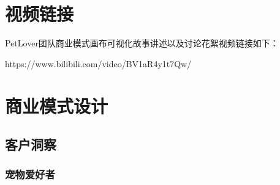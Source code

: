 \documentclass[a4paper]{ctexart}
\begin{document}
\section{视频链接}

PetLover团队商业模式画布可视化故事讲述以及讨论花絮视频链接如下：

https://www.bilibili.com/video/BV1aR4y1t7Qw/

\section{商业模式设计}

\subsection{客户洞察}

\subsubsection{宠物爱好者}
\end{document}
